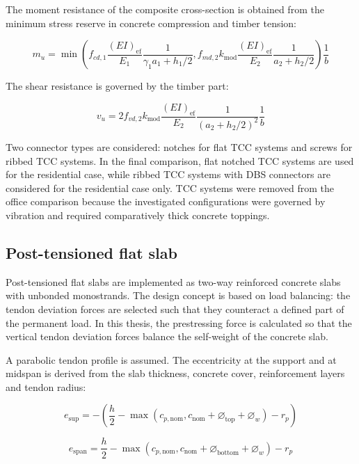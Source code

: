 \noindent The moment resistance of the composite cross-section is obtained from the minimum stress reserve in concrete compression and timber tension:

\[
    m_u =
    \min
    \left(
        f_{cd,1}
        \frac{(EI)_{\mathrm{ef}}}{E_1}
        \frac{1}{\gamma_1 a_1+h_1/2},
        f_{md,2} k_{\mathrm{mod}}
        \frac{(EI)_{\mathrm{ef}}}{E_2}
        \frac{1}{a_2+h_2/2}
    \right)
    \frac{1}{b}
\]

\noindent The shear resistance is governed by the timber part:

\[
    v_u =
    2 f_{vd,2} k_{\mathrm{mod}}
    \frac{(EI)_{\mathrm{ef}}}{E_2}
    \frac{1}{(a_2+h_2/2)^2}
    \frac{1}{b}
\]

\noindent Two connector types are considered: notches for flat TCC systems and screws for ribbed TCC systems. In the final comparison, flat notched TCC systems are used for the residential case, while ribbed TCC systems with DBS connectors are considered for the residential case only. TCC systems were removed from the office comparison because the investigated configurations were governed by vibration and required comparatively thick concrete toppings.

\subsection{Post-tensioned flat slab}

Post-tensioned flat slabs are implemented as two-way reinforced concrete slabs with unbonded monostrands. The design concept is based on load balancing: the tendon deviation forces are selected such that they counteract a defined part of the permanent load. In this thesis, the prestressing force is calculated so that the vertical tendon deviation forces balance the self-weight of the concrete slab.

\noindent A parabolic tendon profile is assumed. The eccentricity at the support and at midspan is derived from the slab thickness, concrete cover, reinforcement layers and tendon radius:

\[
    e_{\mathrm{sup}}
    =
    -
    \left(
        \frac{h}{2}
        -
        \max(c_{p,\mathrm{nom}},c_{\mathrm{nom}}+\varnothing_{\mathrm{top}}+\varnothing_w)
        -
        r_p
    \right)
\]

\[
    e_{\mathrm{span}}
    =
    \frac{h}{2}
    -
    \max(c_{p,\mathrm{nom}},c_{\mathrm{nom}}+\varnothing_{\mathrm{bottom}}+\varnothing_w)
    -
    r_p
\]

